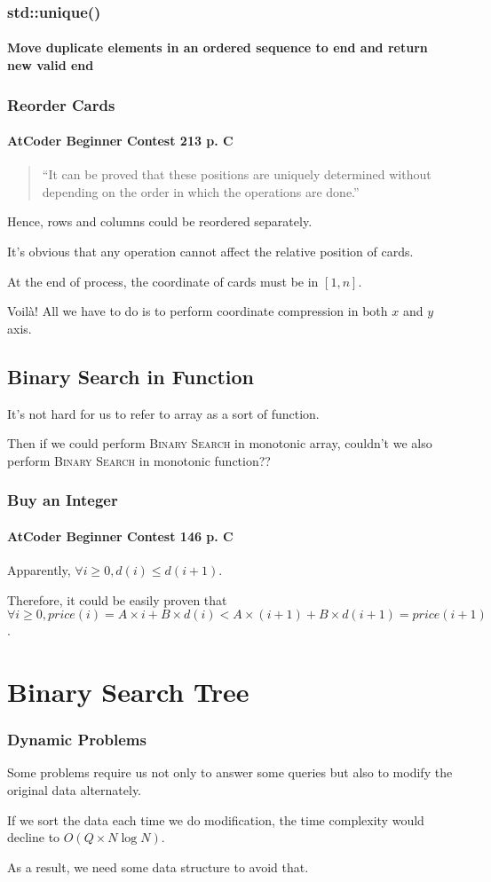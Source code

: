 \documentclass{beamer}
\begin{document}
\frame
{
	\frametitle{\ttfamily std::unique()}
	\framesubtitle{Move duplicate elements in an ordered sequence to end and return new valid end}
	
	
}

\frame
{
	\frametitle{Reorder Cards}
	\framesubtitle{AtCoder Beginner Contest 213 p. C}
	
	\begin{quote}
		``It can be proved that these positions are uniquely determined without depending on the order in which the operations are done.''
	\end{quote}
	
	\pause
	
	Hence, rows and columns could be reordered separately.\pause
	
	It's obvious that any operation cannot affect the relative position of cards.\pause
	
	At the end of process, the coordinate of cards must be in $[1, n]$.\pause
	
	Voil\`{a}! All we have to do is to perform coordinate compression in both $x$ and $y$ axis.
}

\subsection{Binary Search in Function}

\frame
{
	It's not hard for us to refer to array as a sort of function.\pause
	
	Then if we could perform \textsc{Binary Search} in monotonic array, couldn't we also perform \textsc{Binary Search} in monotonic function??
}

\frame
{
	\frametitle{Buy an Integer}
	\framesubtitle{AtCoder Beginner Contest 146 p. C}
	
	Apparently, $\forall i\geq 0, d(i)\leq d(i+1)$.\pause
	
	Therefore, it could be easily proven that $\forall i\geq 0, price(i) = A\times i+B\times d(i) < A\times(i+1)+B\times d(i+1) = price(i+1)$.\pause
}

\section{Binary Search Tree}

\frame
{
	\frametitle{Dynamic Problems}
	
	Some problems require us not only to answer some queries but also to modify the original data alternately.
	
	If we sort the data each time we do modification, the time complexity would decline to $O(Q\times N\log N)$.
	
	As a result, we need some data structure to avoid that.
}
\end{document}
